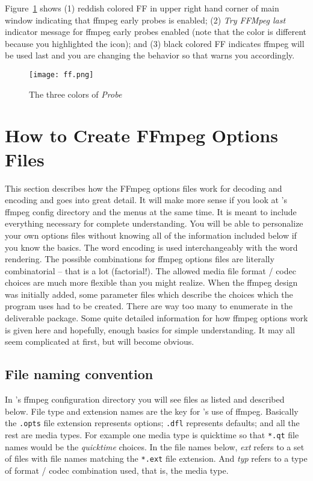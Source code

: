 Figure~\ref{fig:ff} shows (1) reddish colored FF in upper right hand corner of main window indicating
that ffmpeg early probes is enabled; (2) \textit{Try FFMpeg last}  indicator message for ffmpeg early probes enabled (note that the color is different because you highlighted the icon); and (3) black colored FF indicates ffmpeg will be used last and you are changing the behavior so that \CGG{} warns you accordingly.

\begin{figure}[htpb]
    \centering
    \texttt{[image: ff.png]}
    \caption{The three colors of \textit{Probe}}
    \label{fig:ff}
\end{figure}

\section{How to Create FFmpeg Options Files}%
\label{sec:create_ffmpeg_options_files}

This section describes how the FFmpeg options files work for decoding and encoding and goes into great detail.  It will make more sense if you look at \CGG{}'s ffmpeg config directory and the \CGG{} menus at the same time.  
It is meant to include everything necessary for complete understanding.  You will be able to personalize your own options files without knowing all of the information included below if you know the basics.  The word encoding is used interchangeably with the word rendering.
The possible combinations for ffmpeg options files are literally combinatorial -- that is a lot (factorial!).  The allowed media file format / codec choices are much more flexible than you might realize.  When the ffmpeg design was initially added, some parameter files which describe the choices which the program uses had to be created.  There are way too many to enumerate in the deliverable \CGG{} package.  Some quite detailed information for how ffmpeg options work is given here and hopefully, enough basics for simple understanding.  It may all seem complicated at first, but will become obvious.

\subsection{File naming convention}%
\label{sub:file_naming_convention}

In \CGG{}'s ffmpeg configuration directory you will see files as listed and described below.  File type and extension names are the key for \CGG{}'s use of ffmpeg.  Basically the \texttt{.opts} file extension represents options; \texttt{.dfl} represents defaults; and all the rest are media types.  For example one media type is quicktime so that \texttt{*.qt} file names would be the \textit{quicktime} choices.  In the file names below, \textit{ext} refers to a set of files with file names matching the \texttt{*.ext} file extension.  And \textit{typ} refers to a type of format / codec combination used, that is, the media type.

